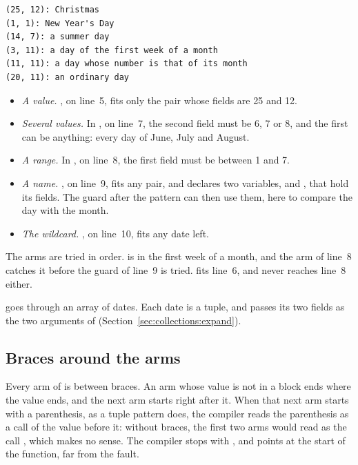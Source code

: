 
\vspace{-10pt}%
\begin{lstlisting}[style=bashVerb]
(25, 12): Christmas
(1, 1): New Year's Day
(14, 7): a summer day
(3, 11): a day of the first week of a month
(11, 11): a day whose number is that of its month
(20, 11): an ordinary day
\end{lstlisting}

\begin{itemize}
\item \textit{A value.} , on line~5, fits only the pair whose
  fields are 25 and 12.
\item \textit{Several values.} In , on line~7, the second
  field must be 6, 7 or 8, and the first can be anything: every day of June,
  July and August.
\item \textit{A range.} In , on line~8, the first field
  must be between 1 and 7.
\item \textit{A name.} , on line~9, fits any pair, and declares
  two variables,  and , that hold its fields. The guard after
  the pattern can then use them, here to compare the day with the month.
\item \textit{The wildcard.} \token{\_}, on line~10, fits any date left.
\end{itemize}

The arms are tried in order.  is in the first week of a month,
and the arm of line~8 catches it before the guard of line~9 is tried.
 fits line~6, and never reaches line~8 either.

 goes through an array of dates. Each date is a tuple, and
 passes its two fields as the two arguments of
 (Section~\ref{sec:collections:expand}).

\subsection{Braces around the arms}

Every arm of  is between braces. An arm whose value is not in a
block ends where the value ends, and the next arm starts right after it. When
that next arm starts with a parenthesis, as a tuple pattern does, the compiler
reads the parenthesis as a call of the value before it: without braces, the
first two arms would read as the call , which makes no
sense. The compiler stops with , and
points at the start of the function, far from the fault.

